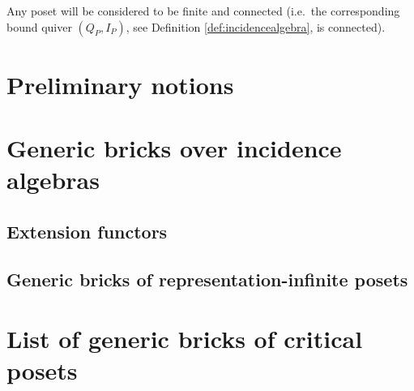 \documentclass[10pt,oneside, a4paper,reqno]{amsart}
\theoremstyle{definition}
\newcommand{\HasseQuiver}[1]{Q_{#1}}        %
\begin{document}
	Any poset will be considered to be finite and connected (i.e.~the corresponding bound quiver $(\HasseQuiver{P}, I_P)$, see Definition \ref{def:incidencealgebra}, is connected).
	
	\section{Preliminary notions}	
	
	
		
	\section{Generic bricks over incidence algebras}
	
	
	\subsection{Extension functors}\label{section:extensionfunctor}
	
	
	\subsection{Generic bricks of representation-infinite posets}\label{section:genbrickreprinf}
	

	\newpage
	
	\appendix 
	
	\section{List of generic bricks of critical posets}\label{appendix}
	
	
	
	
	\printbibliography
	
	
	
\end{document}
